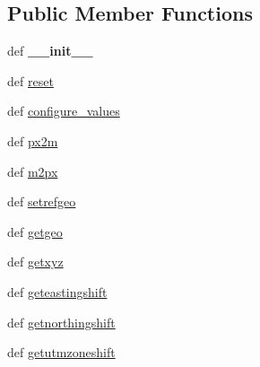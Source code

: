 \subsection*{Public Member Functions}
\begin{DoxyCompactItemize}
\item 
\hypertarget{classcore_1_1location_1_1_core_location_a28257ce92198a9603eb3ec6940c25c21}{def {\bfseries \+\_\+\+\_\+init\+\_\+\+\_\+}}\label{classcore_1_1location_1_1_core_location_a28257ce92198a9603eb3ec6940c25c21}

\item 
def \hyperlink{classcore_1_1location_1_1_core_location_a8e4bf5274a9701aa49cea19f22ef3bdf}{reset}
\item 
def \hyperlink{classcore_1_1location_1_1_core_location_ad8a40fe290ea3d9ab887213e800ea4ed}{configure\+\_\+values}
\item 
def \hyperlink{classcore_1_1location_1_1_core_location_aa37cbc4a001d177869d4d17f91b40e00}{px2m}
\item 
def \hyperlink{classcore_1_1location_1_1_core_location_a81ee18e6f38b910be43b5e16281a036b}{m2px}
\item 
def \hyperlink{classcore_1_1location_1_1_core_location_ac7ce57734ea6410f1c967ccd8c41cc07}{setrefgeo}
\item 
def \hyperlink{classcore_1_1location_1_1_core_location_aff421a8becc3f1e6dfbe293844b9e428}{getgeo}
\item 
def \hyperlink{classcore_1_1location_1_1_core_location_aceda178d736cbc157e7054bce6c21693}{getxyz}
\item 
def \hyperlink{classcore_1_1location_1_1_core_location_a029c898662e5914a94ee57573a800705}{geteastingshift}
\item 
def \hyperlink{classcore_1_1location_1_1_core_location_a71697023a929814514b1f732f39e469c}{getnorthingshift}
\item 
def \hyperlink{classcore_1_1location_1_1_core_location_ad1a40dc08ed66e4a75f674f1cfd68d3d}{getutmzoneshift}
\end{DoxyCompactItemize}
